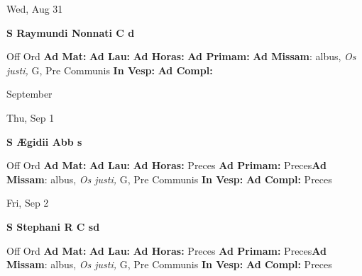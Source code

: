 \documentclass[10pt]{memoir}
\begin{document}
\begin{center}
\begin{minipage}{3.5in}
\vspace{2em}
\begin{center}Wed, Aug 31
\end{center}
\textbf{ \large S Raymundi Nonnati C
\textnormal{\normalsize d}}

\begin{justify}Off Ord
\textbf{Ad Mat: }
\textbf{Ad Lau: }
\textbf{Ad Horas: }
\textbf{Ad Primam: }\textbf{Ad Missam}: albus, \textit{Os justi,} G, Pre Communis
\textbf{In Vesp: }
\textbf{Ad Compl: }
\end{justify}
\end{minipage}
\end{center}

\begin{center}
\pagebreak
\thispagestyle{empty}
{\Huge September}
\end{center}
                    
\begin{center}
\begin{minipage}{3.5in}
\vspace{2em}
\begin{center}Thu, Sep 1
\end{center}
\textbf{ \large S Ægidii Abb
\textnormal{\normalsize s}}

\begin{justify}Off Ord
\textbf{Ad Mat: }
\textbf{Ad Lau: }
\textbf{Ad Horas: }Preces
\textbf{Ad Primam: }Preces\textbf{Ad Missam}: albus, \textit{Os justi,} G, Pre Communis
\textbf{In Vesp: }
\textbf{Ad Compl: }Preces
\end{justify}
\end{minipage}
\end{center}

\begin{center}
\begin{minipage}{3.5in}
\vspace{2em}
\begin{center}Fri, Sep 2
\end{center}
\textbf{ \large S Stephani R C
\textnormal{\normalsize sd}}

\begin{justify}Off Ord
\textbf{Ad Mat: }
\textbf{Ad Lau: }
\textbf{Ad Horas: }Preces
\textbf{Ad Primam: }Preces\textbf{Ad Missam}: albus, \textit{Os justi,} G, Pre Communis
\textbf{In Vesp: }
\textbf{Ad Compl: }Preces
\end{justify}
\end{minipage}
\end{center}
\end{document}
